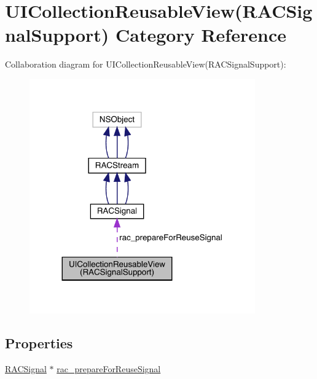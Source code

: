\hypertarget{category_u_i_collection_reusable_view_07_r_a_c_signal_support_08}{}\section{U\+I\+Collection\+Reusable\+View(R\+A\+C\+Signal\+Support) Category Reference}
\label{category_u_i_collection_reusable_view_07_r_a_c_signal_support_08}


Collaboration diagram for U\+I\+Collection\+Reusable\+View(R\+A\+C\+Signal\+Support)\+:\nopagebreak
\begin{figure}[H]
\begin{center}
\leavevmode
\includegraphics[width=275pt]{category_u_i_collection_reusable_view_07_r_a_c_signal_support_08__coll__graph}
\end{center}
\end{figure}
\subsection*{Properties}
\begin{DoxyCompactItemize}
\item 
\mbox{\hyperlink{interface_r_a_c_signal}{R\+A\+C\+Signal}} $\ast$ \mbox{\hyperlink{category_u_i_collection_reusable_view_07_r_a_c_signal_support_08_a59adfeb852087723b2a7d9736b27d8d5}{rac\+\_\+prepare\+For\+Reuse\+Signal}}
\end{DoxyCompactItemize}


